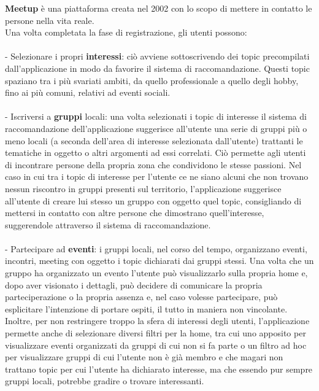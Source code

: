 \documentclass[fleqn,10pt]{SelfArx} %
\begin{document}
{\small %
\textbf{Meetup} è una piattaforma creata nel 2002 con lo scopo di mettere in contatto le persone nella vita reale.\\
Una volta completata la fase di registrazione, gli utenti possono: \\
\\
- Selezionare i propri \textbf{interessi}: ciò avviene sottoscrivendo dei topic precompilati dall'applicazione in modo da favorire il sistema di raccomandazione. 
Questi topic spaziano tra i più svariati ambiti, da quello professionale a quello degli hobby, fino ai più comuni, relativi ad eventi sociali. \\
\\
- Iscriversi a \textbf{gruppi} locali: una volta selezionati i topic di interesse il sistema di raccomandazione dell'applicazione suggerisce all'utente una serie di gruppi più o meno locali (a seconda dell'area di interesse selezionata dall'utente) trattanti le tematiche in oggetto o altri argomenti ad essi correlati. 
Ciò permette agli utenti di incontrare persone della propria zona che condividono le stesse passioni. 
Nel caso in cui tra i topic di interesse per l'utente ce ne siano alcuni che non trovano nessun riscontro in gruppi presenti sul territorio, l'applicazione suggerisce all'utente di creare lui stesso un gruppo con oggetto quel topic, consigliando di mettersi in contatto con altre persone che dimostrano quell'interesse, suggerendole attraverso il sistema di raccomandazione.\\
\\
- Partecipare ad \textbf{eventi}: i gruppi locali, nel corso del tempo, organizzano eventi, incontri, meeting con oggetto i topic dichiarati dai gruppi stessi. 
Una volta che un gruppo ha organizzato un evento l'utente può visualizzarlo sulla propria home e, dopo aver visionato i dettagli, può decidere di comunicare la propria parteciperazione o la propria assenza e, nel caso volesse partecipare, può esplicitare l'intenzione di portare ospiti, il tutto in maniera non vincolante. 
Inoltre, per non restringere troppo la sfera di interessi degli utenti, l'applicazione permette anche di selezionare diversi filtri per la home, tra cui uno apposito per visualizzare eventi organizzati da gruppi di cui non si fa parte o un filtro ad hoc per visualizzare gruppi di cui l'utente non è già membro e che magari non trattano topic per cui l'utente ha dichiarato interesse, ma che essendo pur sempre gruppi locali, potrebbe gradire o trovare interessanti.\\
}
\end{document}
